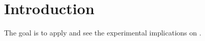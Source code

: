 \chapter{Introduction}

The goal is to apply \cite{Arkani_2009} and see the experimental implications on \cite{Profumo_2018}.